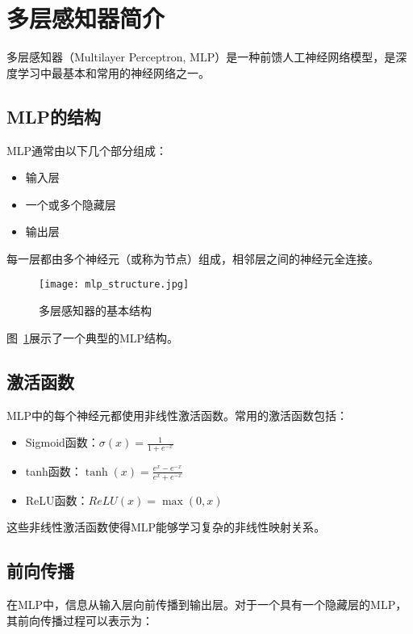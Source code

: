 \section{多层感知器简介}

多层感知器（Multilayer Perceptron, MLP）是一种前馈人工神经网络模型，是深度学习中最基本和常用的神经网络之一\cite{Goodfellow2016}。

\subsection{MLP的结构}

MLP通常由以下几个部分组成：
\begin{itemize}
    \item 输入层
    \item 一个或多个隐藏层
    \item 输出层
\end{itemize}

每一层都由多个神经元（或称为节点）组成，相邻层之间的神经元全连接。

\begin{figure}
    \centering
    \texttt{[image: mlp\_structure.jpg]}
    \caption{多层感知器的基本结构}
    \label{fig:mlp_structure}
\end{figure}

图~\ref{fig:mlp_structure}展示了一个典型的MLP结构。

\subsection{激活函数}

MLP中的每个神经元都使用非线性激活函数。常用的激活函数包括：

\begin{itemize}
    \item Sigmoid函数：$\sigma(x) = \frac{1}{1 + e^{-x}}$
    \item tanh函数：$\tanh(x) = \frac{e^x - e^{-x}}{e^x + e^{-x}}$
    \item ReLU函数：$ReLU(x) = \max(0, x)$
\end{itemize}

这些非线性激活函数使得MLP能够学习复杂的非线性映射关系\cite{Nair2010}。

\subsection{前向传播}

在MLP中，信息从输入层向前传播到输出层。对于一个具有一个隐藏层的MLP，其前向传播过程可以表示为：


